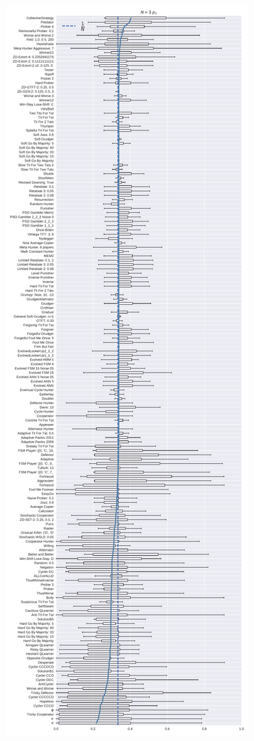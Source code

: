 \documentclass{article}
\begin{document}
\begin{figure}[!hbtp]
    \centering
    \begin{subfigure}[t]{.3\textwidth}
        \centering
        \includegraphics[width=\textwidth]{./img/boxplot_3_invade.pdf}

\end{subfigure}
\end{figure}
\end{document}
